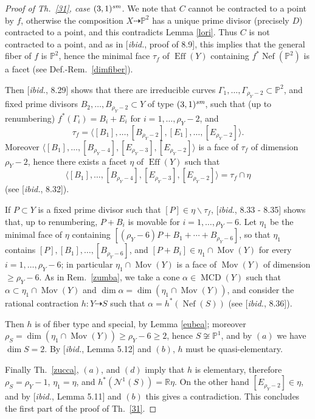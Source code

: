 \documentclass[a4paper,12pt]{amsart}
\theoremstyle{definition}
\numberwithin{figure}{section}
\numberwithin{table}{section}
\newcommand{\pr}{\mathbb{P}}
\newcommand{\R}{\mathbb{R}}
\newcommand{\Nu}{\mathcal{N}^1}
\newcommand{\Eff}{\operatorname{Eff}}
\newcommand{\Nef}{\operatorname{Nef}}
\newcommand{\Mov}{\operatorname{Mov}}
\newcommand{\MCD}{\operatorname{MCD}}
\newcommand{\sm}{\text{\it sm}}
\begin{document}
\begin{proof}[Proof of Th.~\ref{31}, case $(3,1)^{\sm}$]
 We note that $C$ cannot be contracted to a point by $f$, otherwise  the composition $X\dasharrow \pr^2$ has a unique prime divisor (precisely $D$) contracted to a point, and this contradicts Lemma \ref{lori}. Thus $C$ is not contracted to a point,
   and as in [\emph{ibid.}, proof of 8.9], this implies that the general fiber of $f$ is $\pr^2$, hence the minimal face $\tau_f$ of $\Eff(Y)$ containing $f^*\Nef(\pr^2)$ is a facet (see Def.-Rem.~\ref{dimfiber}).

   Then [\emph{ibid.}, 8.29] shows that there are  irreducible curves $\Gamma_1,\dotsc,\Gamma_{\rho_Y-2}\subset\pr^2$, and fixed prime divisors $B_2,\dotsc,B_{\rho_Y-2}\subset Y$ of type $(3,1)^{\sm}$, such that (up to renumbering) $f^*(\Gamma_i)=B_i+E_i$ for $i=1,\dotsc,\rho_Y-2$, and
   $$\tau_f=\langle[B_1],\dotsc,[B_{\rho_Y-2}], [E_1],\dotsc,[E_{\rho_Y-2}]\rangle.$$
   Moreover $\langle [B_1],\dotsc,[B_{\rho_Y-4}], [E_{\rho_Y-3}],[E_{\rho_Y-2}]\rangle$ is a face of $\tau_f$ of dimension $\rho_Y-2$, hence there exists a  facet  $\eta$ of $\Eff(Y)$ such that $$\langle [B_1],\dotsc,[B_{\rho_Y-4}], [E_{\rho_Y-3}],[E_{\rho_Y-2}]\rangle=\tau_f\cap\eta$$
   (see [\emph{ibid.}, 8.32]).

   If $P\subset Y$ is a fixed prime divisor such that $[P]\in\eta\smallsetminus\tau_f$, [\emph{ibid.}, 8.33 - 8.35] shows that, up to renumbering, $P+B_i$ is movable for $i=1,\dotsc,\rho_Y-6$. Let $\eta_1$ be the minimal face of $\eta$ containing $[(\rho_Y-6)P+B_1+\cdots+B_{\rho_Y-6}]$, so that $\eta_1$ contains $[P],[B_1],\dotsc,[B_{\rho_Y-6}]$, and $[P+B_i]\in\eta_1\cap\Mov(Y)$ for every $i=1,\dotsc,\rho_Y-6$; in particular $\eta_1\cap\Mov(Y)$ is a face of $\Mov(Y)$ of dimension $\geq \rho_Y-6$. As in Rem.~\ref{zumba}, we take a cone $\alpha\in\MCD(Y)$ such that $\alpha\subset\eta_1\cap\Mov(Y)$ and $\dim\alpha=\dim(\eta_1\cap\Mov(Y))$, and consider the rational contraction  $h\colon Y\dasharrow S$  such that $\alpha=h^*(\Nef(S))$ (see [\emph{ibid.}, 8.36]).

 Then $h$ is of fiber type and special, by Lemma \ref{eubea}; moreover $\rho_S=\dim(\eta_1\cap\Mov(Y))\geq \rho_Y-6\geq 2$, hence $S\not\cong\pr^1$, and by $(a)$ we have $\dim S=2$.
 By   [\emph{ibid.}, Lemma 5.12] and $(b)$, $h$ must be quasi-elementary. 

 Finally Th.~\ref{zucca}, $(a)$, and $(d)$ imply that $h$ is elementary, therefore
$\rho_S=\rho_Y-1$, $\eta_1=\eta$, and $h^*(\Nu(S))=\R\eta$. On the other hand $[E_{\rho_Y-2}]\in\eta$, and by  [\emph{ibid.}, Lemma 5.11] and $(b)$ this gives a contradiction.
This concludes the first part of the proof of Th.~\ref{31}.
\qedhere
    \end{proof}
\end{document}
